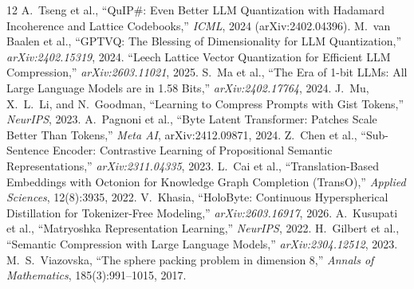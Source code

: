 \documentclass[10pt,twocolumn,letterpaper]{article}
\begin{document}
\begin{thebibliography}{12}
\footnotesize
{} A.~Tseng et al., ``QuIP\#: Even Better LLM Quantization with Hadamard Incoherence and Lattice Codebooks,'' \textit{ICML}, 2024 (arXiv:2402.04396).
 M.~van Baalen et al., ``GPTVQ: The Blessing of Dimensionality for LLM Quantization,'' \textit{arXiv:2402.15319}, 2024.
 ``Leech Lattice Vector Quantization for Efficient LLM Compression,'' \textit{arXiv:2603.11021}, 2025.
 S.~Ma et al., ``The Era of 1-bit LLMs: All Large Language Models are in 1.58 Bits,'' \textit{arXiv:2402.17764}, 2024.
 J.~Mu, X.~L.~Li, and N.~Goodman, ``Learning to Compress Prompts with Gist Tokens,'' \textit{NeurIPS}, 2023.
 A.~Pagnoni et al., ``Byte Latent Transformer: Patches Scale Better Than Tokens,'' \textit{Meta AI}, arXiv:2412.09871, 2024.
 Z.~Chen et al., ``Sub-Sentence Encoder: Contrastive Learning of Propositional Semantic Representations,'' \textit{arXiv:2311.04335}, 2023.
 L.~Cai et al., ``Translation-Based Embeddings with Octonion for Knowledge Graph Completion (TransO),'' \textit{Applied Sciences}, 12(8):3935, 2022.
 V.~Khasia, ``HoloByte: Continuous Hyperspherical Distillation for Tokenizer-Free Modeling,'' \textit{arXiv:2603.16917}, 2026.
 A.~Kusupati et al., ``Matryoshka Representation Learning,'' \textit{NeurIPS}, 2022.
 H.~Gilbert et al., ``Semantic Compression with Large Language Models,'' \textit{arXiv:2304.12512}, 2023.
 M.~S.~Viazovska, ``The sphere packing problem in dimension 8,'' \textit{Annals of Mathematics}, 185(3):991--1015, 2017.
\end{thebibliography}
\end{document}
